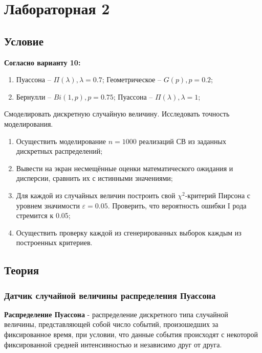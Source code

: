 \section{Лабораторная 2}

\subsection{Условие}

\textbf{Согласно варианту 10:}
\begin{enumerate}
	\item Пуассона – $\Pi(\lambda), \lambda = 0.7$; Геометрическое – $G(p), p = 0.2$;
	\item Бернулли – $Bi(1, p), p = 0.75$; Пуассона – $\Pi(\lambda), \lambda = 1$;
\end{enumerate}

Смоделировать дискретную случайную величину. Исследовать точность моделирования.

\begin{enumerate}
	\item Осуществить моделирование $n = 1000$ реализаций СВ из заданных дискретных распределений;
	\item Вывести на экран несмещённые оценки математического ожидания и дисперсии, сравнить их с истинными значениями;
	\item Для каждой из случайных величин построить свой $\chi^{2}$-критерий Пирсона с уровнем значимости $\varepsilon = 0.05$. Проверить, что вероятность ошибки I рода стремится к 0.05;
	\item Осуществить проверку каждой из сгенерированных выборок каждым из построенных критериев.
\end{enumerate}

\subsection{Теория}
\subsubsection{Датчик случайной величины распределения Пуассона}

\textbf{Распределение Пуассона} -  распределение дискретного типа случайной величины, представляющей собой число событий, произошедших за фиксированное время, при условии, что данные события происходят с некоторой фиксированной средней интенсивностью и независимо друг от друга.\\

